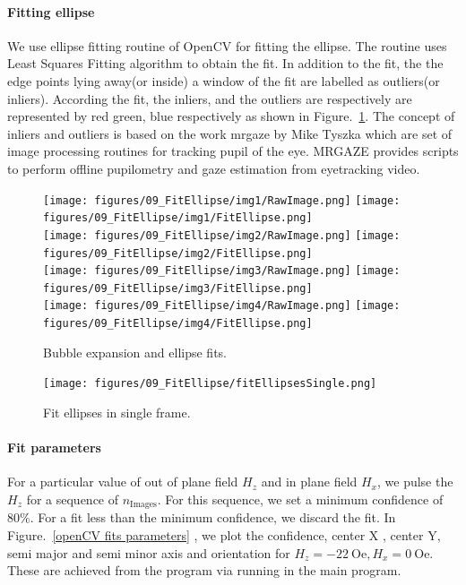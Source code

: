 \documentclass[12pt, twoside, a4paper]{article}
\begin{document}
\paragraph{Fitting ellipse}
We use ellipse fitting routine of OpenCV for fitting the ellipse. The routine uses Least Squares Fitting algorithm to obtain the fit. In addition to the fit, the the edge points lying away(or inside) a window of the fit are labelled as outliers(or inliers). According the fit, the inliers, and the outliers are respectively are represented by red green, blue respectively as shown in Figure.~\ref{openCV ellipse fits}. The concept of inliers and outliers is based on the work mrgaze by Mike Tyszka which are set of image processing routines for tracking pupil of the eye. MRGAZE provides scripts to perform offline pupilometry and gaze estimation from eyetracking video.~\cite{Tyszka2015}
%
\begin{figure}[!htbp]
	\centering
	\texttt{[image: figures/09\_FitEllipse/img1/RawImage.png]}
	\texttt{[image: figures/09\_FitEllipse/img1/FitEllipse.png]}\\
	\texttt{[image: figures/09\_FitEllipse/img2/RawImage.png]}
	\texttt{[image: figures/09\_FitEllipse/img2/FitEllipse.png]} \\
	\texttt{[image: figures/09\_FitEllipse/img3/RawImage.png]}
	\texttt{[image: figures/09\_FitEllipse/img3/FitEllipse.png]} \\		\texttt{[image: figures/09\_FitEllipse/img4/RawImage.png]}
	\texttt{[image: figures/09\_FitEllipse/img4/FitEllipse.png]}
	\caption{Bubble expansion and ellipse fits.
	}
	\label{openCV ellipse fits}
\end{figure}
%
%
\begin{figure}[!htbp]
	\centering
	\texttt{[image: figures/09\_FitEllipse/fitEllipsesSingle.png]}
	\caption{Fit ellipses in single frame.
	}
	\label{openCV fit ellipses single frame}
\end{figure}
%
\paragraph{Fit parameters}
For a particular value of out of plane field $H_{z}$ and in plane field $H_{x}$, we pulse the $H_{z}$ for a sequence of $n_{\mathrm{Images}}$. For this sequence, we set a minimum confidence of $80\%$. For a fit less than the minimum confidence, we discard the fit. In Figure.~\ref{openCV fits parameters} , we plot the confidence, center X , center Y, semi major and semi minor axis and orientation for $H_z = -22~\mathrm{Oe}, H_x = 0~\mathrm{Oe}$. These are achieved from the program via running in the main program.
%
\clearpage
\end{document}
